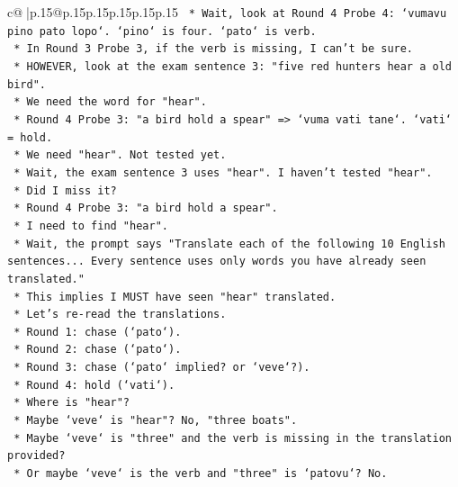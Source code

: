 \documentclass{article}
\begin{document}
{\begin{supertabular}{c@{$\;$}|p{.15\linewidth}@{}p{.15\linewidth}p{.15\linewidth}p{.15\linewidth}p{.15\linewidth}p{.15\linewidth}}
{{{\texttt{                        *   Wait, look at Round 4 Probe 4: `vumavu pino pato lopo`. `pino` is four. `pato` is verb.} \\
\texttt{                        *   In Round 3 Probe 3, if the verb is missing, I can't be sure.} \\
\texttt{                        *   HOWEVER, look at the exam sentence 3: "five red hunters hear a old bird".} \\
\texttt{                        *   We need the word for "hear".} \\
\texttt{                        *   Round 4 Probe 3: "a bird hold a spear" => `vuma vati tane`. `vati` = hold.} \\
\texttt{                        *   We need "hear". Not tested yet.} \\
\texttt{                        *   Wait, the exam sentence 3 uses "hear". I haven't tested "hear".} \\
\texttt{                        *   Did I miss it?} \\
\texttt{                        *   Round 4 Probe 3: "a bird hold a spear".} \\
\texttt{                        *   I need to find "hear".} \\
\texttt{                        *   Wait, the prompt says "Translate each of the following 10 English sentences... Every sentence uses only words you have already seen translated."} \\
\texttt{                        *   This implies I MUST have seen "hear" translated.} \\
\texttt{                        *   Let's re{-}read the translations.} \\
\texttt{                        *   Round 1: chase (`pato`).} \\
\texttt{                        *   Round 2: chase (`pato`).} \\
\texttt{                        *   Round 3: chase (`pato` implied? or `veve`?).} \\
\texttt{                        *   Round 4: hold (`vati`).} \\
\texttt{                        *   Where is "hear"?} \\
\texttt{                        *   Maybe `veve` is "hear"? No, "three boats".} \\
\texttt{                        *   Maybe `veve` is "three" and the verb is missing in the translation provided?} \\
\texttt{                        *   Or maybe `veve` is the verb and "three" is `patovu`? No.} \\
}}}
\end{supertabular}}
\end{document}
